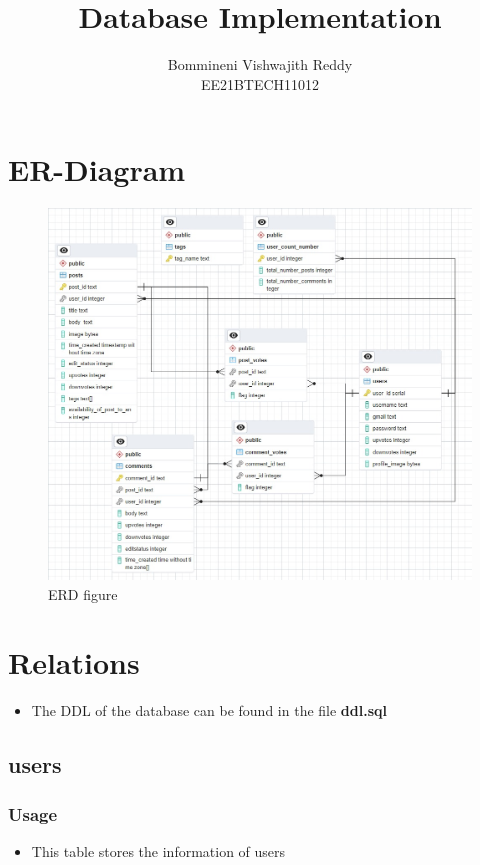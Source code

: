 \documentclass[12pt,a4paper]{article}
\title{Database Implementation}
\author{ Bommineni Vishwajith Reddy \\ EE21BTECH11012 }
\date{}
\begin{document}
	\maketitle
	
	\tableofcontents
	\newpage
	
	\section{ER-Diagram}
		\begin{figure}[H]
		\centering
		\includegraphics[width=1\textwidth]{ER_dig}
		\caption{ERD figure}
	\end{figure}
\newpage
	\section{Relations}
	\begin{itemize}
		\item   The DDL of the database can be found in the file \textbf{ddl.sql}
	\end{itemize}
	\subsection{users}
	\subsubsection{Usage}
		\begin{itemize}
		\item This table stores the information of users
	\end{itemize}
\end{document}
